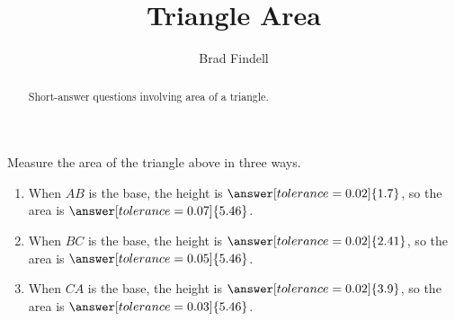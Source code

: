 \documentclass[nooutcomes]{ximera}
\title{Triangle Area}
\author{Brad Findell}
\begin{document}
\begin{abstract}
Short-answer questions involving area of a triangle. 
\end{abstract}
\maketitle

\begin{problem}
\begin{center}  
\end{center}
Measure the area of the triangle above in three ways.  
\begin{enumerate}
\item When $AB$ is the base, the height is $\answer[tolerance=0.02]{1.7}$, so the area is $\answer[tolerance=0.07]{5.46}$.
\item When $BC$ is the base, the height is $\answer[tolerance=0.02]{2.41}$, so the area is $\answer[tolerance=0.05]{5.46}$.
\item When $CA$ is the base, the height is $\answer[tolerance=0.02]{3.9}$, so the area is $\answer[tolerance=0.03]{5.46}$.
\end{enumerate}
\end{problem}
\end{document}
